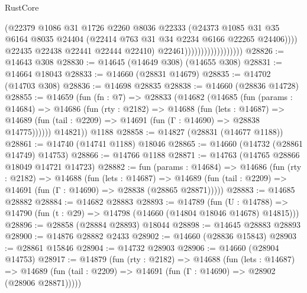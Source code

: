 \begin{lexlean}{RustCore}
\begin{coremodule}
                                            (@22379
                                              @1086
                                              @31
                                              @1726
                                              @2260
                                              @8036
                                              @22333
                                              (@24373
                                                @1085
                                                @31
                                                @35
                                                @6164
                                                @8035
                                                @24404
                                                (@22414 @763 @31 @34 @2234 @6166 @22265 @24406))))
                                          @22435
                                          @22438
                                          @22441
                                          @22444
                                          @22410)
                                        @22461))))))))))))))))))
@28826 := @14643 @308
@28830 := @14645 (@14649 @308) (@14655 @308)
@28831 := @14664 @18043
@28833 := @14660 (@28831 @14679)
@28835 := @14702 (@14703 @308)
@28836 := @14698 @28835
@28838 := @14660 (@28836 @14728)
@28855 := @14659
    (fun (fn : @7) =>
    @28833
      (@14682
        (@14685
          (fun (params : @14684) =>
          @14686
            (fun (rty : @2182) =>
            @14688
              (fun (lets : @14687) =>
              @14689 (fun (tail : @2209) => @14691 (fun (Γ : @14690) => @28838 @14775))))))
        @14821))
    @1188
@28858 := @14827 (@28831 (@14677 @1188))
@28861 := @14740 (@14741 @1188) @18046
@28865 := @14660 (@14732 (@28861 @14749) @14753)
@28866 := @14766 @1188
@28871 := @14763 (@14765 @28866 @18049 @14721 @14723)
@28882 := fun (params : @14684) =>
  @14686
    (fun (rty : @2182) =>
    @14688
      (fun (lets : @14687) =>
      @14689 (fun (tail : @2209) => @14691 (fun (Γ : @14690) => @28838 (@28865 @28871)))))
@28883 := @14685 @28882
@28884 := @14682 @28883
@28893 := @14789
    (fun (U : @14788) => @14790 (fun (t : @29) => @14798 (@14660 (@14804 @18046 @14678) @14815)))
@28896 := @28858 (@28884 @28893) @18044
@28898 := @14645 @28883 @28893
@28900 := @14876 @28882 @2433
@28902 := @14660 (@28836 @15843)
@28903 := @28861 @15846
@28904 := @14732 @28903
@28906 := @14660 (@28904 @14753)
@28917 := @14879
    (fun (rty : @2182) =>
    @14688
      (fun (lets : @14687) =>
      @14689 (fun (tail : @2209) => @14691 (fun (Γ : @14690) => @28902 (@28906 @28871)))))

\end{coremodule}
\end{lexlean}
